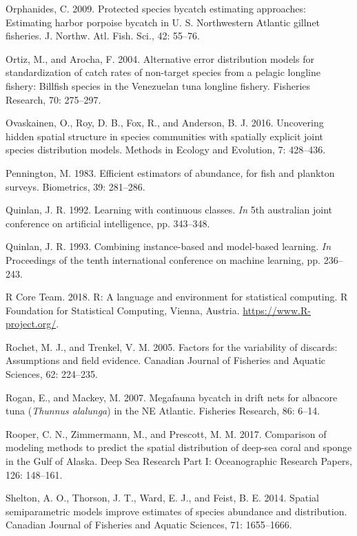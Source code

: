 \documentclass[]{article}
\begin{document}
\hypertarget{ref-orphanides2009}{}
Orphanides, C. 2009. Protected species bycatch estimating approaches:
Estimating harbor porpoise bycatch in U. S. Northwestern Atlantic
gillnet fisheries. J. Northw. Atl. Fish. Sci., 42: 55--76.

\hypertarget{ref-ortiz2004}{}
Ortiz, M., and Arocha, F. 2004. Alternative error distribution models
for standardization of catch rates of non-target species from a pelagic
longline fishery: Billfish species in the Venezuelan tuna longline
fishery. Fisheries Research, 70: 275--297.

\hypertarget{ref-ovaskainen2016}{}
Ovaskainen, O., Roy, D. B., Fox, R., and Anderson, B. J. 2016.
Uncovering hidden spatial structure in species communities with
spatially explicit joint species distribution models. Methods in Ecology
and Evolution, 7: 428--436.

\hypertarget{ref-pennington1983}{}
Pennington, M. 1983. Efficient estimators of abundance, for fish and
plankton surveys. Biometrics, 39: 281--286.

\hypertarget{ref-quinlan1992}{}
Quinlan, J. R. 1992. Learning with continuous classes. \emph{In} 5th
australian joint conference on artificial intelligence, pp. 343--348.

\hypertarget{ref-quinlan1993}{}
Quinlan, J. R. 1993. Combining instance-based and model-based learning.
\emph{In} Proceedings of the tenth international conference on machine
learning, pp. 236--243.

\hypertarget{ref-rcoreteam2018}{}
R Core Team. 2018. R: A language and environment for statistical
computing. R Foundation for Statistical Computing, Vienna, Austria.
\url{https://www.R-project.org/}.

\hypertarget{ref-rochet2005}{}
Rochet, M. J., and Trenkel, V. M. 2005. Factors for the variability of
discards: Assumptions and field evidence. Canadian Journal of Fisheries
and Aquatic Sciences, 62: 224--235.

\hypertarget{ref-rogan2007}{}
Rogan, E., and Mackey, M. 2007. Megafauna bycatch in drift nets for
albacore tuna (\emph{Thunnus alalunga}) in the NE Atlantic. Fisheries
Research, 86: 6--14.

\hypertarget{ref-rooper2017}{}
Rooper, C. N., Zimmermann, M., and Prescott, M. M. 2017. Comparison of
modeling methods to predict the spatial distribution of deep-sea coral
and sponge in the Gulf of Alaska. Deep Sea Research Part I:
Oceanographic Research Papers, 126: 148--161.

\hypertarget{ref-shelton2014}{}
Shelton, A. O., Thorson, J. T., Ward, E. J., and Feist, B. E. 2014.
Spatial semiparametric models improve estimates of species abundance and
distribution. Canadian Journal of Fisheries and Aquatic Sciences, 71:
1655--1666.
\end{document}
